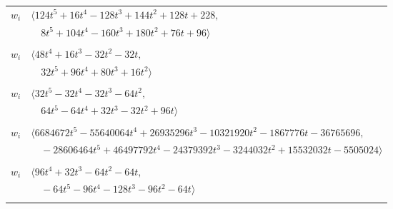 \documentclass[11pt]{article}
\begin{document}
\begin{longtable}{@{}ll@{}}
$w_i$ & $\langle 124t^{5}+16t^{4}-128t^{3}+144t^{2}+128t+228,$\\
 & $\quad 8t^{5}+104t^{4}-160t^{3}+180t^{2}+76t+96\rangle$\\
\addlinespace[2pt]
\multicolumn{2}{@{}p{0.97\textwidth}@{}}{$i=48$, $D_i=16$, $\rho_{ij}$: $1{:}1, \allowbreak 18{:}1, \allowbreak 19{:}2, \allowbreak 22{:}1, \allowbreak 24{:}2, \allowbreak 26{:}1, \allowbreak 37{:}2$}\\
$w_i$ & $\langle 48t^{4}+16t^{3}-32t^{2}-32t,$\\
 & $\quad 32t^{5}+96t^{4}+80t^{3}+16t^{2}\rangle$\\
\addlinespace[2pt]
\multicolumn{2}{@{}p{0.97\textwidth}@{}}{$i=49$, $D_i=32$, $\rho_{ij}$: $3{:}1, \allowbreak 8{:}2, \allowbreak 21{:}1, \allowbreak 24{:}1, \allowbreak 32{:}2, \allowbreak 45{:}1, \allowbreak 50{:}1$}\\
$w_i$ & $\langle 32t^{5}-32t^{4}-32t^{3}-64t^{2},$\\
 & $\quad 64t^{5}-64t^{4}+32t^{3}-32t^{2}+96t\rangle$\\
\addlinespace[2pt]
\multicolumn{2}{@{}p{0.97\textwidth}@{}}{$i=50$, $D_i=32768$, $\rho_{ij}$: $1{:}2, \allowbreak 2{:}1, \allowbreak 3{:}2, \allowbreak 6{:}2, \allowbreak 8{:}1, \allowbreak 18{:}1, \allowbreak 28{:}1, \allowbreak 30{:}1, \allowbreak 37{:}1, \allowbreak 44{:}2, \allowbreak 47{:}2, \allowbreak 49{:}2, \allowbreak 54{:}1, \allowbreak 61{:}1, \allowbreak 62{:}2$}\\
$w_i$ & $\langle 6684672t^{5}-55640064t^{4}+26935296t^{3}-10321920t^{2}-1867776t-36765696,$\\
 & $\quad -28606464t^{5}+46497792t^{4}-24379392t^{3}-3244032t^{2}+15532032t-5505024\rangle$\\
\addlinespace[2pt]
\multicolumn{2}{@{}p{0.97\textwidth}@{}}{$i=51$, $D_i=32$, $\rho_{ij}$: $2{:}2, \allowbreak 5{:}2, \allowbreak 11{:}1, \allowbreak 19{:}1, \allowbreak 21{:}1, \allowbreak 24{:}1, \allowbreak 36{:}1, \allowbreak 37{:}1, \allowbreak 46{:}1$}\\
$w_i$ & $\langle 96t^{4}+32t^{3}-64t^{2}-64t,$\\
 & $\quad -64t^{5}-96t^{4}-128t^{3}-96t^{2}-64t\rangle$\\
\addlinespace[2pt]
\multicolumn{2}{@{}p{0.97\textwidth}@{}}{$i=52$, $D_i=8$, $\rho_{ij}$: $5{:}1, \allowbreak 12{:}2, \allowbreak 19{:}2, \allowbreak 30{:}1, \allowbreak 33{:}1, \allowbreak 38{:}2, \allowbreak 40{:}2, \allowbreak 41{:}2, \allowbreak 56{:}2, \allowbreak 59{:}2, \allowbreak 60{:}2$}\\

\end{longtable}
\end{document}
